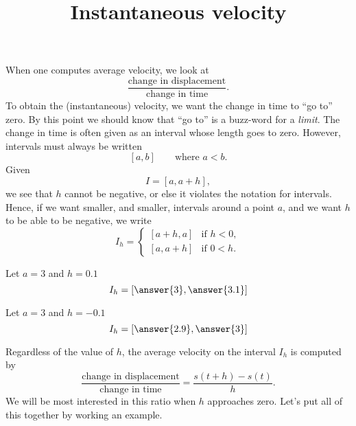 \documentclass{ximera}
\title[Dig-In:]{Instantaneous velocity}
\begin{document}
\begin{abstract}
\end{abstract}
\maketitle

When one computes average velocity, we look at 
\[
\frac{\text{change in displacement}}{\text{change in time}}.
\]
To obtain the (instantaneous) velocity, we want the change in time to
``go to'' zero. By this point we should know that ``go to'' is a
buzz-word for a \textit{limit}. The change in time is often given as
an interval whose length goes to zero.  However, intervals must always
be written
\[
[a,b] \qquad\text{where $a < b$.}
\]
Given
\[
I = [a, a+h],
\]
we see that $h$ cannot be negative, or else it violates the notation
for intervals. Hence, if we want smaller, and smaller, intervals
around a point $a$, and we want $h$ to be able to be negative, we
write
\[
I_h = 
\begin{cases}
  [a+h,a]  & \text{if $h<0$}, \\ %
  [a,a+h]  & \text{if $0<h$}.     %
\end{cases}
\]
\begin{question}
  Let $a = 3$ and $h = 0.1$
  \[
  I_h = \left[\answer{3},\answer{3.1} \right]
  \]
  \begin{question}
    Let $a = 3$ and $h = -0.1$
  \[
  I_h = \left[\answer{2.9},\answer{3} \right]
  \]
  \end{question}
\end{question}

Regardless of the value of $h$, the average velocity on the interval
$I_h$ is computed by
\[
\frac{\text{change in displacement}}{\text{change in time}} =
\frac{s(t+h)-s(t)}{h}.
\]
We will be most interested in this ratio when $h$ approaches zero.
Let's put all of this together by working an example.
\end{document}
